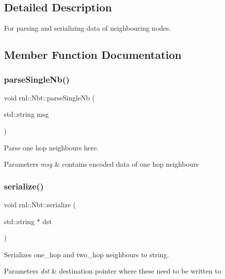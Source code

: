 \subsection{Detailed Description}
For parsing and serializing data of neighbouring nodes. 

\subsection{Member Function Documentation}
\mbox{\label{structrnl_1_1Nbt_afbf05ea7acf58fdda393ccd291831652}} 
\subsubsection{\texorpdfstring{parse\+Single\+Nb()}{parseSingleNb()}}
{\footnotesize\ttfamily void rnl\+::\+Nbt\+::parse\+Single\+Nb (\begin{DoxyParamCaption}\item[{std\+::string}]{msg }\end{DoxyParamCaption})}



Parse one hop neighbours here. 


\begin{DoxyParams}{Parameters}
{\em msg} & contains encoded data of one hop neighbours \\
\hline
\end{DoxyParams}
\mbox{\label{structrnl_1_1Nbt_a74c608778b20feae99067fed53587274}} 
\subsubsection{\texorpdfstring{serialize()}{serialize()}}
{\footnotesize\ttfamily void rnl\+::\+Nbt\+::serialize (\begin{DoxyParamCaption}\item[{std\+::string $\ast$}]{dst }\end{DoxyParamCaption})}



Serializes one\+\_\+hop and two\+\_\+hop neighbours to string. 


\begin{DoxyParams}{Parameters}
{\em dst} & destination pointer where these need to be written to \\
\hline
\end{DoxyParams}


